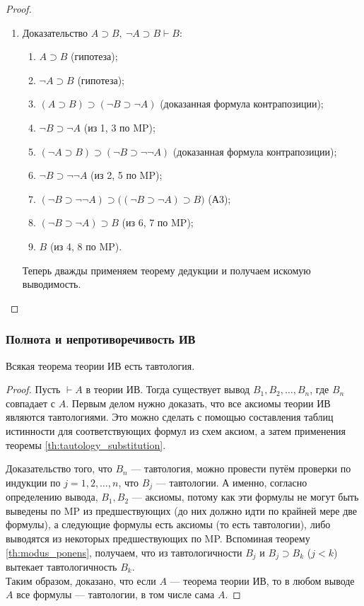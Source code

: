 \begin{proof}
\begin{enumerate}[label=\arabic*)]
        \item Доказательство $A \supset B,\ \neg A \supset B \vdash B$:
        \begin{enumerate}[label=\arabic*.]
            \item $A \supset B$ (гипотеза);
            \item $\neg A \supset B$ (гипотеза);
            \item $(A \supset B) \supset (\neg B \supset \neg A)$ (доказанная формула контрапозиции);
            \item $\neg B \supset \neg A$ (из 1, 3 по MP);
            \item $(\neg A \supset B) \supset (\neg B \supset \neg\neg A)$ (доказанная формула контрапозиции);
            \item $\neg B \supset \neg\neg A$ (из 2, 5 по MP);
            \item $(\neg B \supset \neg\neg A) \supset \big((\neg B \supset \neg A) \supset B\big)$ (А3);
            \item $(\neg B \supset \neg A) \supset B$ (из 6, 7 по MP);
            \item $B$ (из 4, 8 по MP).
        \end{enumerate}
        Теперь дважды применяем теорему дедукции и получаем искомую выводимость.
    \end{enumerate}
\end{proof}

\subsubsection{Полнота и непротиворечивость ИВ}
\begin{lemma}
    Всякая теорема теории ИВ есть тавтология.
\end{lemma}
\begin{proof}
    Пусть $\vdash A$ в теории ИВ. Тогда существует вывод $B_1, B_2, \dots, B_n$, где $B_n$ совпадает с $A$. Первым делом нужно доказать, что все аксиомы теории ИВ являются тавтологиями. Это можно сделать с помощью составления таблиц истинности для соответствующих формул из схем аксиом, а затем применения теоремы \ref{th:tautology_substitution}.

    Доказательство того, что $B_n$ --- тавтология, можно провести путём проверки по индукции по $j = 1, 2, \dots, n$, что $B_j$ --- тавтологии. А именно, согласно определению вывода, $B_1, B_2$ --- аксиомы, потому как эти формулы не могут быть выведены по MP из предшествующих (до них должно идти по крайней мере две формулы), а следующие формулы есть аксиомы (то есть тавтологии), либо выводятся из некоторых предшествующих по MP. Вспоминая теорему \ref{th:modus_ponens}, получаем, что из тавтологичности $B_j$ и $B_j \supset B_k$ ($j < k$) вытекает тавтологичность $B_k$. \\
    Таким образом, доказано, что если $A$ --- теорема теории ИВ, то в любом выводе $A$ все формулы --- тавтологии, в том числе сама $A$.
\end{proof}

